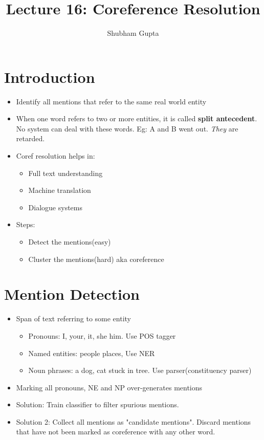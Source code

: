 \documentclass[a4paper]{article}
\title{Lecture 16: Coreference Resolution}
\author{Shubham Gupta}
\begin{document}
\maketitle
\section{Introduction}
\begin{itemize}
    \item Identify all mentions that refer to the same real world entity
    \item When one word refers to two or more entities, it is called \textbf{split antecedent}. No system can deal with these words. Eg: A and B went out. \textit{They} are retarded.  
    \item Coref resolution helps in:
    \begin{itemize}
        \item Full text understanding
        \item Machine translation
        \item Dialogue systems
    \end{itemize}
    \item Steps:
    \begin{itemize}
        \item Detect the mentions(easy)
        \item Cluster the mentions(hard) aka coreference
    \end{itemize}
\end{itemize}
\section{Mention Detection}
\begin{itemize}
    \item Span of text referring to some entity
    \begin{itemize}
        \item Pronouns: I, your, it, she him. Use POS tagger
        \item Named entities: people places, Use NER
        \item Noun phrases: a dog, cat stuck in tree. Use parser(constituency parser)
    \end{itemize}
    \item Marking all pronouns, NE and NP over-generates mentions
    \item Solution: Train classifier to filter spurious mentions. 
    \item Solution 2: Collect all mentions as "candidate mentions". Discard mentions that have not been marked as coreference with any other word.
\end{itemize}
\end{document}

